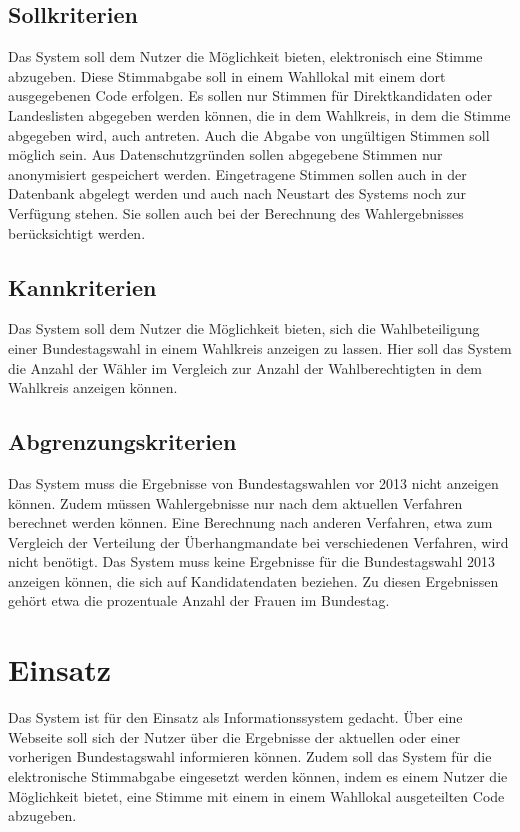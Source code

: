 \documentclass[a4paper]{scrreprt}
\begin{document}
\subsection{Sollkriterien}

Das System soll dem Nutzer die Möglichkeit bieten, elektronisch eine Stimme abzugeben. Diese Stimmabgabe soll in einem Wahllokal mit einem dort ausgegebenen Code erfolgen. Es sollen nur Stimmen für Direktkandidaten oder Landeslisten abgegeben werden können, die in dem Wahlkreis, in dem die Stimme abgegeben wird, auch antreten. Auch die Abgabe von ungültigen Stimmen soll möglich sein. Aus Datenschutzgründen sollen abgegebene Stimmen nur anonymisiert gespeichert werden. Eingetragene Stimmen sollen auch in der Datenbank abgelegt werden und auch nach Neustart des Systems noch zur Verfügung stehen. Sie sollen auch bei der Berechnung des Wahlergebnisses berücksichtigt werden. 

\subsection{Kannkriterien}

Das System soll dem Nutzer die Möglichkeit bieten, sich die Wahlbeteiligung einer Bundestagswahl in einem Wahlkreis anzeigen zu lassen. Hier soll das System die Anzahl der Wähler im Vergleich zur Anzahl der Wahlberechtigten in dem Wahlkreis anzeigen können. 
 
\subsection{Abgrenzungskriterien}

Das System muss die Ergebnisse von Bundestagswahlen vor 2013 nicht anzeigen können. Zudem müssen Wahlergebnisse nur nach dem aktuellen Verfahren berechnet werden können. Eine Berechnung nach anderen Verfahren, etwa zum Vergleich der Verteilung der Überhangmandate bei verschiedenen Verfahren, wird nicht benötigt. Das System muss keine Ergebnisse für die Bundestagswahl 2013 anzeigen können, die sich auf Kandidatendaten beziehen. Zu diesen Ergebnissen gehört etwa die prozentuale Anzahl der Frauen im Bundestag.
 
\section{Einsatz}
Das System ist für den Einsatz als Informationssystem gedacht. Über eine Webseite soll sich der Nutzer über die Ergebnisse der aktuellen oder einer vorherigen Bundestagswahl informieren können. Zudem soll das System für die elektronische Stimmabgabe eingesetzt werden können, indem es einem Nutzer die Möglichkeit bietet, eine Stimme mit einem in einem Wahllokal ausgeteilten Code abzugeben.
 
\end{document}
